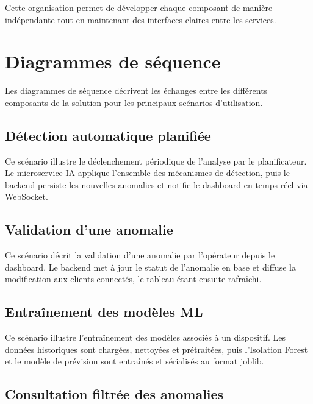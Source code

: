 Cette organisation permet de développer chaque composant de manière
indépendante tout en maintenant des interfaces claires entre les services.

\section{Diagrammes de séquence}

Les diagrammes de séquence décrivent les échanges entre les différents
composants de la solution pour les principaux scénarios d'utilisation.

\subsection{Détection automatique planifiée}

Ce scénario illustre le déclenchement périodique de l'analyse par le
planificateur. Le microservice IA applique l'ensemble des mécanismes de
détection, puis le backend persiste les nouvelles anomalies et notifie le
dashboard en temps réel via WebSocket.


\subsection{Validation d'une anomalie}

Ce scénario décrit la validation d'une anomalie par l'opérateur depuis le
dashboard. Le backend met à jour le statut de l'anomalie en base et diffuse
la modification aux clients connectés, le tableau étant ensuite rafraîchi.


\subsection{Entraînement des modèles ML}

Ce scénario illustre l'entraînement des modèles associés à un dispositif.
Les données historiques sont chargées, nettoyées et prétraitées, puis
l'Isolation Forest et le modèle de prévision sont entraînés et sérialisés
au format joblib.


\subsection{Consultation filtrée des anomalies}

